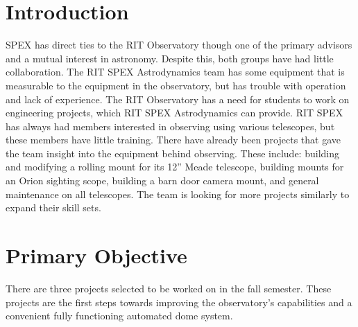 \documentclass[conference]{IEEEtran} %
\begin{document}

\section{Introduction}
\label{sec:introduction}

 SPEX has direct ties to the RIT Observatory though one of the primary advisors and a mutual interest in astronomy.
Despite this, both groups have had little collaboration.
The RIT SPEX Astrodynamics team has some equipment that is measurable to the equipment in the observatory, but has trouble with operation and lack of experience.
The RIT Observatory has a need for students to work on engineering projects, which RIT SPEX Astrodynamics can provide.
RIT SPEX has always had members interested in observing using various telescopes, but these members have little training.
There have already been projects that gave the team insight into the equipment behind observing.
These include: building and modifying a rolling mount for its 12'' Meade telescope, building mounts for an Orion sighting scope, building a barn door camera mount, and general maintenance on all telescopes.
The team is looking for more projects similarly to expand their skill sets.

\section{Primary Objective}
\label{sec:primary-obj}

  There are three projects selected to be worked on in the fall semester.
  These projects are the first steps towards improving the observatory's capabilities and a convenient fully functioning automated dome system.
\end{document}
